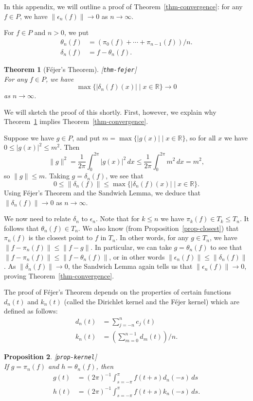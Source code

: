 \documentclass{amsart}
\newcommand{\lbl}[1]{\label{#1}\textup{[\texttt{#1}]}\ \\}
\newcommand{\lbl}{\label}
\newcommand{\R}         {{\mathbb{R}}}
\newcommand{\dl}        {\delta}
\newcommand{\ep}        {\epsilon}
\newcommand{\tht}       {\theta}
\newcommand{\st}        {\;|\;}
\renewcommand{\:}       {\colon}
\newtheorem{theorem}{Theorem}[section]
\newtheorem{proposition}[theorem]{Proposition}
\theoremstyle{definition}
\begin{document}
In this appendix, we will outline a proof of
Theorem~\ref{thm-convergence}: for any $f\in P$, we have
$\|\ep_n(f)\|\to 0$ as $n\to\infty$.

For $f\in P$ and $n>0$, we put 
\begin{align*}
 \tht_n(f) &= (\pi_0(f) + \dotsb + \pi_{n-1}(f))/n. \\
 \dl_n(f)  &= f - \tht_n(f).
\end{align*} 

\begin{theorem}[F\'ejer's Theorem]\lbl{thm-fejer}
 For any $f\in P$, we have
 \[ \max\{|\dl_n(f)(x)|\st x\in\R\} \to 0 \]
 as $n\to\infty$.
\end{theorem}

We will sketch the proof of this shortly.  First, however,
we explain why Theorem~\ref{thm-fejer} implies
Theorem~\ref{thm-convergence}.  

Suppose we have $g\in P$, and put 
$m=\max\{|g(x)|\st x\in\R\}$, so for all $x$ we have 
$0\leq|g(x)|^2\leq m^2$.  Then 
\[ \|g\|^2 = \frac{1}{2\pi}\int_0^{2\pi}|g(x)|^2\,dx \leq
    \frac{1}{2\pi}\int_0^{2\pi} m^2\,dx = m^2,
\]
so $\|g\|\leq m$.  Taking $g=\dl_n(f)$, we see that
\[ 0\leq \|\dl_n(f)\| \leq \max\{|\dl_n(f)(x)|\st x\in\R\}. \]
Using F\'ejer's Theorem and the Sandwich Lemma, we deduce
that $\|\dl_n(f)\|\to 0$ as $n\to\infty$.  

We now need to relate $\dl_n$ to $\ep_n$.  Note that for
$k\leq n$ we have $\pi_k(f)\in T_k\leq T_n$.  It follows
that $\tht_n(f)\in T_n$.  We also know (from
Proposition~\ref{prop-closest}) that $\pi_n(f)$ is the
closest point to $f$ in $T_n$.  In other words, for any
$g\in T_n$, we have $\|f-\pi_n(f)\|\leq\|f-g\|$.  In
particular, we can take $g=\tht_n(f)$ to see that 
$\|f-\pi_n(f)\|\leq\|f-\tht_n(f)\|$, or in other words
$\|\ep_n(f)\|\leq\|\dl_n(f)\|$.  As $\|\dl_n(f)\|\to 0$, the
Sandwich Lemma again tells us that $\|\ep_n(f)\|\to 0$,
proving Theorem~\ref{thm-convergence}.

The proof of F\'ejer's Theorem depends on the properties of
certain functions $d_n(t)$ and $k_n(t)$ (called the
Dirichlet kernel and the F\'ejer kernel) which are defined
as follows: 
\begin{align*}
 d_n(t) &= \sum_{j=-n}^n e_j(t) \\
 k_n(t) &= (\sum_{m=0}^{n-1}d_m(t))/n.
\end{align*}

\begin{proposition}\lbl{prop-kernel}
 If $g=\pi_n(f)$ and $h=\tht_n(f)$, then
 \begin{align*}
  g(t) &= (2\pi)^{-1}\int_{s=-\pi}^\pi f(t+s)d_n(-s)\,ds \\
  h(t) &= (2\pi)^{-1}\int_{s=-\pi}^\pi f(t+s)k_n(-s)\,ds.
 \end{align*}
\end{proposition}
\end{document}
